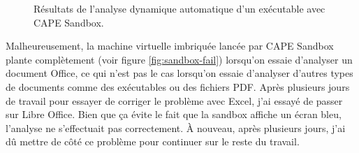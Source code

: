 \begin{figure}
    \centering
    \caption{Résultats de l'analyse dynamique automatique d'un exécutable avec CAPE Sandbox.}
    \label{fig:cape-01}
\end{figure}

Malheureusement, la machine virtuelle imbriquée lancée par CAPE Sandbox plante complètement (voir figure \ref{fig:sandbox-fail}) lorsqu'on essaie d'analyser un document Office, ce qui n'est pas le cas lorsqu'on essaie d'analyser d'autres types de documents comme des exécutables ou des fichiers PDF. Après plusieurs jours de travail pour essayer de corriger le problème avec Excel, j'ai essayé de passer sur Libre Office. Bien que ça évite le fait que la sandbox affiche un écran bleu, l'analyse ne s'effectuait pas correctement. À nouveau, après plusieurs jours, j'ai dû mettre de côté ce problème pour continuer sur le reste du travail.

